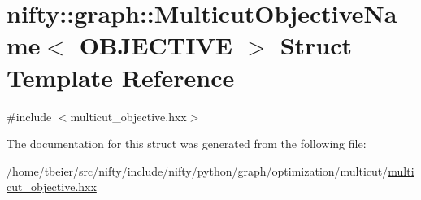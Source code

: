 \hypertarget{structnifty_1_1graph_1_1MulticutObjectiveName}{}\section{nifty\+:\+:graph\+:\+:Multicut\+Objective\+Name$<$ O\+B\+J\+E\+C\+T\+I\+V\+E $>$ Struct Template Reference}
\label{structnifty_1_1graph_1_1MulticutObjectiveName}


{\ttfamily \#include $<$multicut\+\_\+objective.\+hxx$>$}



The documentation for this struct was generated from the following file\+:\begin{DoxyCompactItemize}
\item 
/home/tbeier/src/nifty/include/nifty/python/graph/optimization/multicut/\hyperlink{python_2graph_2optimization_2multicut_2multicut__objective_8hxx}{multicut\+\_\+objective.\+hxx}\end{DoxyCompactItemize}
